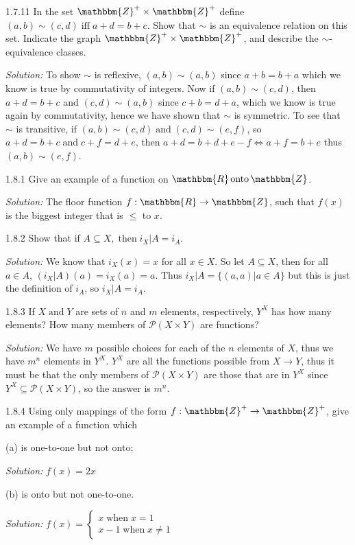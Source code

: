 \documentclass{letter}
\newcommand{\tmop}[1]{\ensuremath{\operatorname{#1}}}
\newcommand{\tmtextit}[1]{{\itshape{#1}}}
\begin{document}
1.7.11 In the set $\mathbbm{Z}^+ \times \mathbbm{Z}^+$ define $(a, b) \sim (c,
d) \tmop{iff} a + d = b + c$. Show that $\sim$ is an equivalence relation on
this set. Indicate the graph $\mathbbm{Z}^+ \times \mathbbm{Z}^+$, and
describe the $\sim$-equivalence classes.

\tmtextit{Solution:} To show $\sim$ is reflexive, $(a, b) \sim (a, b)$ since
$a + b = b + a$ which we know is true by commutativity of integers. Now if
$(a, b) \sim (c, d)$, then $a + d = b + c$ and $(c, d) \sim (a, b)$ since $c +
b = d + a$, which we know is true again by commutativity, hence we have shown
that $\sim$ is symmetric. To see that $\sim$ is transitive, if $(a, b) \sim
(c, d) \tmop{and} (c, d) \sim (e, f)$, so $a + d = b + c \tmop{and} c + f = d
+ e$, then $a + d = b + d + e - f \Leftrightarrow a + f = b + e$ thus $(a, b)
\sim (e, f)$.

1.8.1 Give an example of a function on $\mathbbm{R} \tmop{onto} \mathbbm{Z}$.

\tmtextit{Solution:} The floor function $f : \mathbbm{R} \rightarrow
\mathbbm{Z}$, such that $f (x)$ is the biggest integer that is $\leq$ to $x$.

1.8.2 Show that if $A \subseteq X, \tmop{then} i_X | A = i_A$.

\tmtextit{Solution:} We know that $i_X (x) = x$ for all $x \in X$. So let $A
\subseteq X$, then for all $a \in A$, $(i_X | A) (a) = i_X (a) = a$. Thus $i_X
|A =\{(a, a) | a \in A\}$ but this is just the definition of $i_A$, so $i_X |A
= i_A$.

1.8.3 If $X \tmop{and} Y$ are sets of $n$ and $m$ elements, respectively,
$Y^X$ has how many elements? How many members of $\mathcal{P}(X \times Y)$ are
functions?

\tmtextit{Solution:} We have $m$ possible choices for each of the $n$ elements
of $X$, thus we have $m^n$ elements in $Y^X$. $Y^X$ are all the functions
possible from $X \rightarrow Y$, thus it must be that the only members of
$\mathcal{P}(X \times Y)$ are those that are in $Y^X$ since $Y^X \subseteq
\mathcal{P}(X \times Y)$, so the answer is $m^n$.

1.8.4 Using only mappings of the form $f : \text{$\mathbbm{Z}^+ \rightarrow
\mathbbm{Z}^+$}$, give an example of a function which

(a) is one-to-one but not onto;

\tmtextit{Solution:} $f (x) = 2 x$

(b) is onto but not one-to-one.

\tmtextit{Solution:} $f (x) = \left\{ \begin{array}{l}
  x \tmop{when} x = 1\\
  x - 1 \tmop{when} x \neq 1
\end{array} \right.$
\end{document}
